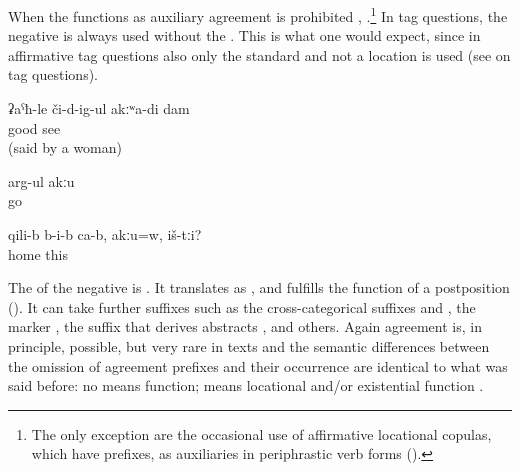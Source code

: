 When the  functions as auxiliary  agreement is prohibited , .\footnote{The only exception are the occasional use of affirmative locational copulas, which have  prefixes, as auxiliaries in periphrastic verb forms ().} In tag questions, the negative  is always used without the   . This is what one would expect, since in affirmative tag questions also only the standard  and not a location  is used (see  on tag questions).

\begin{exe}
	\ex	\label{ex:I do not see well}
	\gll	ʡaˁħ-le	či-d-ig-ul	akːʷa-di	dam\\
		good	see		\\
	\glt	{} (said by a woman)

	\ex	\label{ex:He is not going (with his friends)}
	\gll	arg-ul	akːu\\
		go	\\
	\glt	{}

	\ex	\label{ex:They are inside the house, aren't they}
	\gll	qili-b	b-i-b	ca-b,	akːu=w,	iš-tːi?\\
		home				this\\
	\glt	{}
\end{exe}

The  of the negative  is . It translates as  ,  and fulfills the function of a postposition (). It can take further suffixes such as the cross-categorical suffixes  and , the  marker  , the suffix  that derives abstracts , and others. Again  agreement is, in principle, possible, but very rare in texts  and the semantic differences between the omission of agreement prefixes and their occurrence are identical to what was said before: no   means  function;   means locational and/or existential function .

